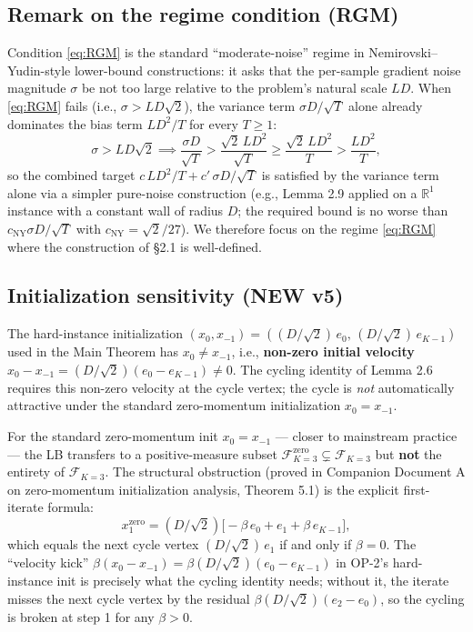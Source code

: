 \documentclass[11pt,a4paper]{article}
\theoremstyle{plain}
\theoremstyle{definition}
\theoremstyle{remark}
\newcommand{\R}{\mathbb{R}}
\newcommand{\F}{\mathcal{F}}
\begin{document}
\subsection{Remark on the regime condition (RGM)}

Condition \eqref{eq:RGM} is the standard ``moderate-noise'' regime in Nemirovski--Yudin-style lower-bound constructions: it asks that the per-sample gradient noise magnitude $\sigma$ be not too large relative to the problem's natural scale $LD$. When \eqref{eq:RGM} fails (i.e., $\sigma > LD\sqrt 2$), the variance term $\sigma D/\sqrt T$ alone already dominates the bias term $LD^2/T$ for every $T \geq 1$:
\[
\sigma > LD\sqrt 2 \implies \frac{\sigma D}{\sqrt T} > \frac{\sqrt 2\, L D^2}{\sqrt T} \geq \frac{\sqrt 2\, L D^2}{T} > \frac{LD^2}{T},
\]
so the combined target $c\,LD^2/T + c'\,\sigma D/\sqrt T$ is satisfied by the variance term alone via a simpler pure-noise construction (e.g., Lemma 2.9 applied on a $\R^1$ instance with a constant wall of radius $D$; the required bound is no worse than $c_\mathrm{NY}\sigma D/\sqrt T$ with $c_\mathrm{NY} = \sqrt 2/27$). We therefore focus on the regime \eqref{eq:RGM} where the construction of \S2.1 is well-defined.

\subsection{Initialization sensitivity (NEW v5)}
\label{sec:0.8}

The hard-instance initialization $(x_0, x_{-1}) = ((D/\sqrt 2)\,e_0,\, (D/\sqrt 2)\,e_{K-1})$ used in the Main Theorem has $x_0 \neq x_{-1}$, i.e., \textbf{non-zero initial velocity} $x_0 - x_{-1} = (D/\sqrt 2)(e_0 - e_{K-1}) \neq 0$. The cycling identity of Lemma 2.6 requires this non-zero velocity at the cycle vertex; the cycle is \emph{not} automatically attractive under the standard zero-momentum initialization $x_0 = x_{-1}$.

For the standard zero-momentum init $x_0 = x_{-1}$ --- closer to mainstream practice --- the LB transfers to a positive-measure subset $\F^{\mathrm{zero}}_{K=3} \subsetneq \F_{K=3}$ but \textbf{not} the entirety of $\F_{K=3}$. The structural obstruction (proved in Companion Document A on zero-momentum initialization analysis, Theorem 5.1) is the explicit first-iterate formula:
\[
x_1^{\mathrm{zero}} = (D/\sqrt 2)\bigl[-\beta\, e_0 + e_1 + \beta\, e_{K-1}\bigr],
\]
which equals the next cycle vertex $(D/\sqrt 2)\,e_1$ if and only if $\beta = 0$. The ``velocity kick'' $\beta(x_0 - x_{-1}) = \beta(D/\sqrt 2)(e_0 - e_{K-1})$ in OP-2's hard-instance init is precisely what the cycling identity needs; without it, the iterate misses the next cycle vertex by the residual $\beta(D/\sqrt 2)(e_2 - e_0)$, so the cycling is broken at step 1 for any $\beta > 0$.
\end{document}
